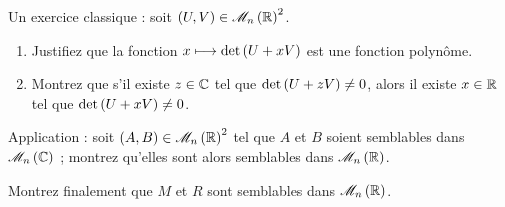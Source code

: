 \begin{q}
Un exercice classique : soit \(\paren{U,V}\in\M{n}[\R]^2\).

\begin{enumerate}
    \item Justifiez que la fonction \(x\longmapsto\det\left(U+xV\right)\) est une fonction polynôme. \\
    \item Montrez que s'il existe \(z\in\mathbb{C}\) tel que \(\det\left(U+zV\right)\not=0\), alors il existe \(x\in\mathbb{R}\) tel que \(\det\left(U+xV\right)\not=0\).
\end{enumerate}

Application : soit \(\paren{A,B}\in\M{n}[\R]^2\) tel que \(A\) et \(B\) soient semblables dans \(\M{n}[\C]\) ; montrez qu'elles sont alors semblables dans \(\M{n}[\R]\).
\end{q}



\begin{q}
Montrez finalement que \(M\) et \(R\) sont semblables dans \(\M{n}[\R]\).
\end{q}


